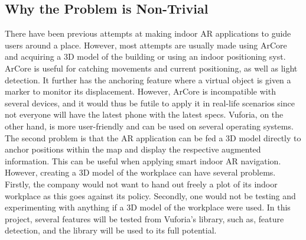 \documentclass{aifyp}
\begin{document}
\subsection{Why the Problem is Non-Trivial}
\indent There have been previous attempts at making indoor AR applications to guide users around a place. However, most attempts are usually made using ArCore and acquiring a 3D model of the building or using an indoor positioning syst. ArCore is useful for catching movements and current positioning, as well as light detection. It further has the anchoring feature where a virtual object is given a marker to monitor its displacement. However, ArCore is incompatible with several devices, and it would thus be futile to apply it in real-life scenarios since not everyone will have the latest phone with the latest specs. Vuforia, on the other hand, is more user-friendly and can be used on several operating systems.
\newline
\newline
\indent The second problem is that the AR application can be fed a 3D model directly to anchor positions within the map and display the respective augmented information. This can be useful when applying smart indoor AR navigation. However, creating a 3D model of the workplace can have several problems. Firstly, the company would not want to hand out freely a plot of its indoor workplace as this goes against its policy. Secondly, one would not be testing and experimenting with anything if a 3D model of the workplace were used. In this project, several features will be tested from Vuforia’s library, such as, feature detection, and the library will be used to its full potential.
\end{document}
